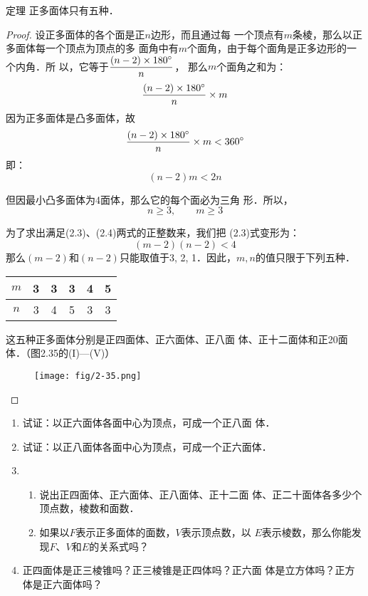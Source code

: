 \begin{blk}
    {定理} 正多面体只有五种．
\end{blk}

\begin{proof}
    设正多面体的各个面是正$n$边形，而且通过每
    一个顶点有$m$条棱，那么以正多面体每一个顶点为顶点的多
    面角中有$m$个面角，由于每个面角是正多边形的一个内角．所
    以，它等于$\dfrac{(n-2)\times 180^{\circ}}{n}$，
    那么$m$个面角之和为：
\[\dfrac{(n-2)\times 180^{\circ}}{n}\times m\]
因为正多面体是凸多面体，故
\[\dfrac{(n-2)\times 180^{\circ}}{n}\times m<360^{\circ}\]
即：
\begin{equation}
    (n-2)m<2n
\end{equation}

但因最小凸多面体为4面体，那么它的每个面必为三角
形．所以，
\begin{equation}
    n\ge 3,\qquad m\ge 3
\end{equation}

为了求出满足(2.3)、(2.4)两式的正整数来，我们把
(2.3)式变形为：
\[(m-2)(n-2)<4\]
那么$(m-2)$和$(n-2)$只能取值于3, 2, 1．因此，$m,n$的值只限于下列五种．
\begin{center}
\begin{tabular}{c|ccccc}
    \hline
   $ m$&3&3&3&4&5\\
   \hline
$n$&3&4&5&3&3\\
\hline
\end{tabular}
\end{center}
这五种正多面体分别是正四面体、正六面体、正八面
体、正十二面体和正20面体．（图2.35的(I)—(V)）
\begin{figure}[htp]
    \centering
\texttt{[image: fig/2-35.png]}
    \caption{}
\end{figure}
\end{proof}

\begin{ex}
\begin{enumerate}
    \item 试证：以正六面体各面中心为顶点，可成一个正八面
    体．
    \item 试证：以正八面体各面中心为顶点，可成一个正六面体．
    \item \begin{enumerate}
        \item 说出正四面体、正六面体、正八面体、正十二面
    体、正二十面体各多少个顶点数，棱数和面数．
    \item 如果以$F$表示正多面体的面数，$V$表示顶点数，以
    $E$表示棱数，那么你能发现$F$、$V$和$E$的关系式吗？
\end{enumerate}
\item 正四面体是正三棱锥吗？正三棱锥是正四体吗？正六面
    体是立方体吗？正方体是正六面体吗？
\end{enumerate}
\end{ex}


